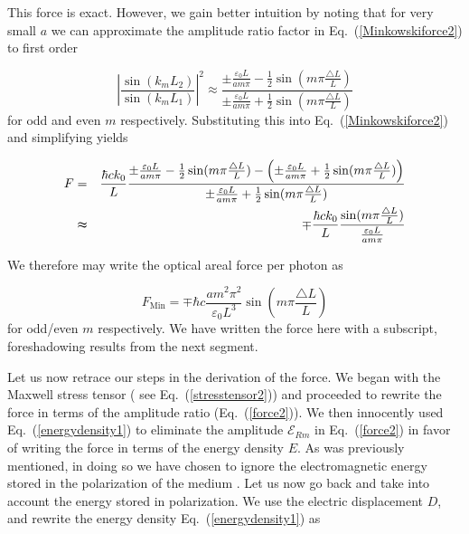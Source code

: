\documentclass[twocolumn,english,pra,aps,superscriptaddress,floatfix]{revtex4-1}
\begin{document}
This force is exact. However, we gain better intuition by noting that for very small $a$ we can approximate the amplitude ratio factor in Eq.\ (\ref{Minkowskiforce2}) to first order 

\begin{equation}
\left|\frac{\sin(k_{m}L_{2})}{\sin(k_{m}L_{1})}\right|^{2}\approx\frac{\pm\frac{\varepsilon_{0}L}{a m\pi}-\frac{1}{2}\sin(m\pi\frac{\triangle L}{L})}{\pm\frac{\varepsilon_{0}L}{a m\pi}+\frac{1}{2}\sin(m\pi\frac{\triangle L}{L})}
\label{amplitudeapproximation}
\end{equation}
for odd and even $m$ respectively. Substituting this into Eq.\ (\ref{Minkowskiforce2}) and simplifying yields

\begin{eqnarray}
F&=&\frac{\hbar ck_0}{L}\frac{\pm\frac{\varepsilon_{0}L}{a m\pi}-\frac{1}{2}\sin(m\pi\frac{\triangle L}{L})-\left(\pm\frac{\varepsilon_{0}L}{a m\pi}+\frac{1}{2}\sin(m\pi\frac{\triangle L}{L})\right)}{\pm\frac{\varepsilon_{0}L}{a m\pi}+\frac{1}{2}\sin(m\pi\frac{\triangle L}{L})} \nonumber \\
&\thickapprox &\mp\frac{\hbar ck_0}{L}\frac{\sin(m\pi\frac{\triangle L}{L})}{\frac{\varepsilon_{0}L}{a m\pi}}
\label{Minkowskiforce3}
\end{eqnarray}

We therefore may write the optical areal force per photon as 

\begin{equation}
F_{\mathrm{Min}}=\mp\hbar c\frac{a m^{2}\pi^{2}}{\varepsilon_{0}L^{3}}\sin(m\pi\frac{\triangle L}{L})
\label{Minkowskiforce4}
\end{equation}
for odd/even $m$ respectively.  We have written the force here with a subscript, foreshadowing results from the next segment.

Let us now retrace our steps in the derivation of the force.  We began with the Maxwell stress tensor ( see Eq.\ (\ref{stresstensor2})) and proceeded to rewrite the force in terms of the amplitude ratio (Eq.\ (\ref{force2})).  We then innocently used Eq.\ (\ref{energydensity1}) to eliminate the amplitude $\mathcal{E}_{Rm}$ in Eq.\ (\ref{force2}) in favor of writing the force in terms of the energy density $E$. As was previously mentioned, in doing so we have chosen to ignore the electromagnetic energy stored in the polarization of the medium \cite{griffiths}. Let us now go back and take into account the energy stored in polarization. We use the electric displacement $D$, and rewrite the energy density Eq.\ (\ref{energydensity1}) as \cite{griffiths}
\end{document}
